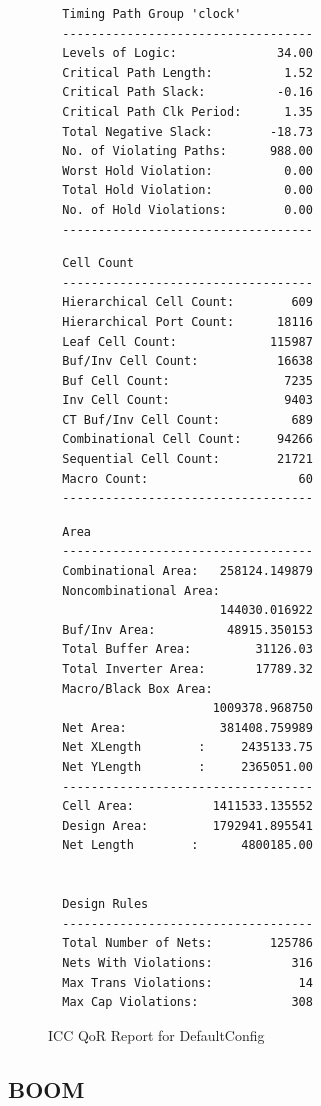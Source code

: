 \documentclass{article}
\begin{document}
\begin{figure}
\begin{multicols}{2}
\begin{verbatim}
  Timing Path Group 'clock'
  -----------------------------------
  Levels of Logic:              34.00
  Critical Path Length:          1.52
  Critical Path Slack:          -0.16
  Critical Path Clk Period:      1.35
  Total Negative Slack:        -18.73
  No. of Violating Paths:      988.00
  Worst Hold Violation:          0.00
  Total Hold Violation:          0.00
  No. of Hold Violations:        0.00
  -----------------------------------
\end{verbatim}

\begin{verbatim}
  Cell Count
  -----------------------------------
  Hierarchical Cell Count:        609
  Hierarchical Port Count:      18116
  Leaf Cell Count:             115987
  Buf/Inv Cell Count:           16638
  Buf Cell Count:                7235
  Inv Cell Count:                9403
  CT Buf/Inv Cell Count:          689
  Combinational Cell Count:     94266
  Sequential Cell Count:        21721
  Macro Count:                     60
  -----------------------------------
\end{verbatim}

\begin{verbatim}
  Area
  -----------------------------------
  Combinational Area:   258124.149879
  Noncombinational Area:
                        144030.016922
  Buf/Inv Area:          48915.350153
  Total Buffer Area:         31126.03
  Total Inverter Area:       17789.32
  Macro/Black Box Area:
                       1009378.968750
  Net Area:             381408.759989
  Net XLength        :     2435133.75
  Net YLength        :     2365051.00
  -----------------------------------
  Cell Area:           1411533.135552
  Design Area:         1792941.895541
  Net Length        :      4800185.00


  Design Rules
  -----------------------------------
  Total Number of Nets:        125786
  Nets With Violations:           316
  Max Trans Violations:            14
  Max Cap Violations:             308
\end{verbatim}
\end{multicols}
  \caption{ICC QoR Report for DefaultConfig}
  \label{res:rocket-qor}
\end{figure}

\clearpage
\subsection{BOOM}
\end{document}
